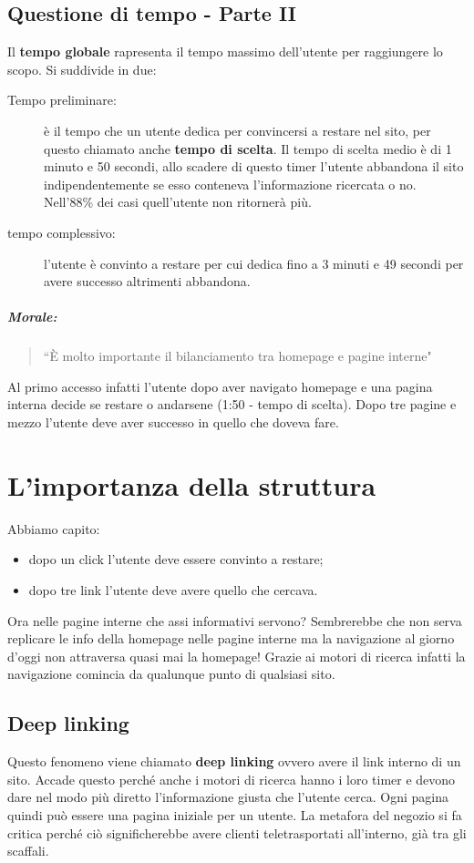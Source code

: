 		\subsection{Questione di tempo - Parte II}
			Il \textbf{tempo globale} rapresenta il tempo massimo dell'utente per raggiungere lo scopo. Si suddivide in due:
			\begin{description}
				\item[Tempo preliminare:] è il tempo che un utente dedica per convincersi a restare nel sito, per questo chiamato anche \textbf{tempo di scelta}. Il tempo di scelta medio è di 1 minuto e 50 secondi, allo scadere di questo timer l'utente abbandona il sito indipendentemente se esso conteneva l'informazione ricercata o no. Nell'88\% dei casi quell'utente non ritornerà più.
				\item[tempo complessivo:] l'utente è convinto a restare per cui dedica fino a 3 minuti e 49 secondi per avere successo altrimenti abbandona.
			\end{description}
			
			\subparagraph*{Morale:}
			\begin{quote}
				``È molto importante il bilanciamento tra homepage e pagine interne"
			\end{quote}
			Al primo accesso infatti l'utente dopo aver navigato homepage e una pagina interna decide se restare o andarsene (1:50 - tempo di scelta). Dopo tre pagine e mezzo l'utente deve aver successo in quello che doveva fare.
	
	\section{L'importanza della struttura}
		Abbiamo capito:
		\begin{itemize}
			\item dopo un click l'utente deve essere convinto a restare;
			\item dopo tre link l'utente deve avere quello che cercava.
		\end{itemize}
		
		Ora nelle pagine interne che assi informativi servono? Sembrerebbe che non serva replicare le info della homepage nelle pagine interne ma la navigazione al giorno d'oggi non attraversa quasi mai la homepage!
		Grazie ai motori di ricerca infatti la navigazione comincia da qualunque punto di qualsiasi sito.
	
		\subsection{Deep linking}
			Questo fenomeno viene chiamato \textbf{deep linking} ovvero avere il link interno di un sito. Accade questo perché anche i motori di ricerca hanno i loro timer e devono dare nel modo più diretto l'informazione giusta che l'utente cerca.
		Ogni pagina quindi può essere una pagina iniziale per un utente. La metafora del negozio si fa critica perché ciò significherebbe avere clienti teletrasportati all'interno, già tra gli scaffali.
		
